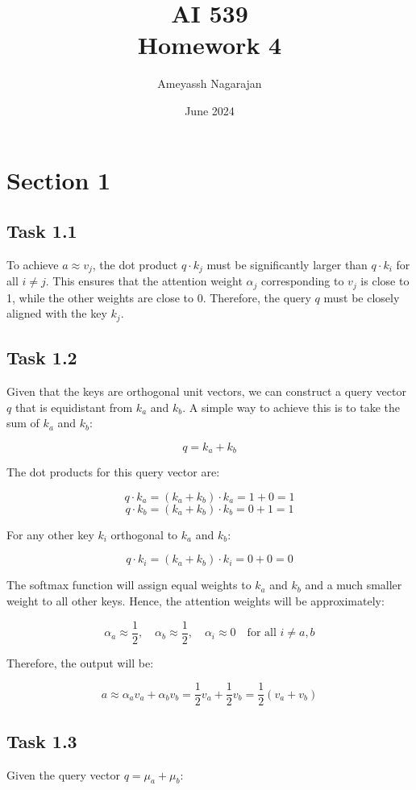 \documentclass{article}
\title{AI 539 \\ Homework 4}
\author{Ameyassh Nagarajan}
\date{June 2024}
\begin{document}
\maketitle

\section{Section 1}
\subsection{Task 1.1}

To achieve \( a \approx v_j \), the dot product \( q \cdot k_j \) must be significantly larger than \( q \cdot k_i \) for all \( i \neq j \). This ensures that the attention weight \( \alpha_j \) corresponding to \( v_j \) is close to 1, while the other weights are close to 0. Therefore, the query \( q \) must be closely aligned with the key \( k_j \).

\subsection{Task 1.2}
Given that the keys are orthogonal unit vectors, we can construct a query vector \( q \) that is equidistant from \( k_a \) and \( k_b \). A simple way to achieve this is to take the sum of \( k_a \) and \( k_b \):

\[
q = k_a + k_b
\]

The dot products for this query vector are:

\[
q \cdot k_a = (k_a + k_b) \cdot k_a = 1 + 0 = 1
\]
\[
q \cdot k_b = (k_a + k_b) \cdot k_b = 0 + 1 = 1
\]

For any other key \( k_i \) orthogonal to \( k_a \) and \( k_b \):

\[
q \cdot k_i = (k_a + k_b) \cdot k_i = 0 + 0 = 0
\]

The softmax function will assign equal weights to \( k_a \) and \( k_b \) and a much smaller weight to all other keys. Hence, the attention weights will be approximately:

\[
\alpha_a \approx \frac{1}{2}, \quad \alpha_b \approx \frac{1}{2}, \quad \alpha_i \approx 0 \quad \text{for all } i \neq a, b
\]

Therefore, the output will be:

\[
a \approx \alpha_a v_a + \alpha_b v_b = \frac{1}{2} v_a + \frac{1}{2} v_b = \frac{1}{2} (v_a + v_b)
\]

\subsection{Task 1.3}
Given the query vector \( q = \mu_a + \mu_b \):
\end{document}

